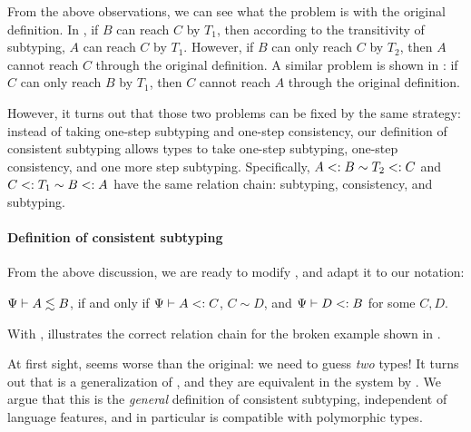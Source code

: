 From the above observations, we can see what the problem is with the original
definition. In , if $B$ can reach $C$ by $T_1$, then
according to the transitivity of subtyping, $A$ can reach $C$ by $T_1$. However,
if $B$ can only reach $C$ by $T_2$, then $A$ cannot reach $C$ through the
original definition. A similar problem is shown in : if $C$ can
only reach $B$ by $T_1$, then $C$ cannot reach $A$ through the original definition.

However, it turns out that those two problems can be fixed by the same strategy:
instead of taking one-step subtyping and one-step consistency, our definition of
consistent subtyping allows types to take one-step subtyping, one-step
consistency, and one more step subtyping. Specifically, $A <: B \sim T_2 <: C$
and $C <: T_1 \sim B <: A$ have the same relation chain: subtyping,
consistency, and subtyping.

\paragraph{Definition of consistent subtyping} From the above discussion, we are
ready to modify , and adapt it to our notation:

\begin{mdef}
  \label{def:decl-conssub}
  $\Psi {} \vdash A \lesssim B$, if and only if $\Psi {} \vdash A <: C$, $C \sim D$, and
  $\Psi {} \vdash D <: B$ for
  some $C, D$.
\end{mdef}

\noindent With , 
illustrates the correct relation chain for the broken example shown in
.

At first sight, 
seems worse than the original: we need to guess \textit{two} types! It turns out
that  is a generalization of
, and they are equivalent in the system by
\citet{siek2007gradual}. We argue that this is the \textit{general} definition of
consistent subtyping, independent of language features, and in particular is
compatible with polymorphic types.


